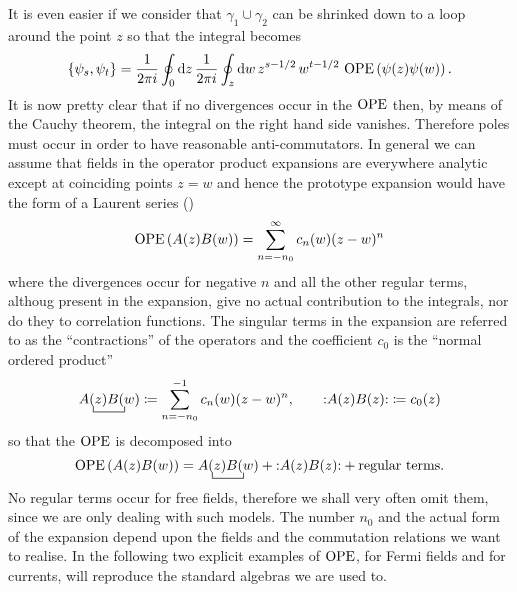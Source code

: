  It is even easier if we consider that $\gamma_1\cup
 \gamma_2$ can be shrinked down to a loop around the
 point $z$ so that the integral becomes
 \[
 \{\psi_s,\psi_t\}=\frac{1}{2\pi i}\oint_0 \textrm{d} z\,
 \frac{1}{2\pi i}\oint_z \textrm{d} w\,
 z^{s-1/2}\,w^{t-1/2}\,\operatorname{OPE}\left(\psi(z)\psi(w)\right).
 \]
 It is now pretty clear that if no divergences occur
 in the $\operatorname{OPE}$ then, by means of the Cauchy theorem, the 
 integral on the right hand side vanishes. Therefore poles must
 occur in order to have reasonable anti-commutators. 
 In general we can assume that fields in the operator 
 product expansions
 are everywhere analytic except at coinciding points
 $z=w$ and hence the prototype expansion would have
 the form of a Laurent series (\cite{Fuchs:1992})
 \begin{equation}
 \operatorname{OPE}\left(A(z)B(w)\right)=\sum_{n=-n_0}^{\infty}
 c_n(w)(z-w)^n
 \end{equation}
 where the divergences occur for negative $n$ and all 
 the other regular terms, althoug present in the expansion,
 give no actual contribution to the integrals, nor 
 do they to correlation functions. The singular terms
 in the expansion are referred to as the ``contractions'' 
 of the operators and the coefficient $c_0$ is the ``normal
 ordered product''
 \[
 \bcontraction{}{A(z)}{}{B(w)}A(z)B(w)\coloneqq
 \sum_{n=-n_0}^{-1}c_n(w)(z-w)^n,\qquad
 \wick{A(z)B(z)}\coloneqq c_0(z)
 \]
 so that the $\operatorname{OPE}$ is decomposed into
 \[
 \OPE\left(A(z)B(w)\right)=
 \bcontraction{}{A(z)}{}{B(w)}A(z)B(w)+
 \wick{A(z)B(z)}+
 \text{regular terms}.
 \]
 No regular terms occur for free fields, therefore we shall 
 very often omit them, since we are only dealing with 
 such models.
 The number $n_0$ and the actual form of the expansion
 depend upon the fields and the commutation relations
 we want to realise. In the following two explicit examples 
 of $\operatorname{OPE}$, for Fermi fields and for currents, will reproduce
 the standard algebras we are used to.
 
